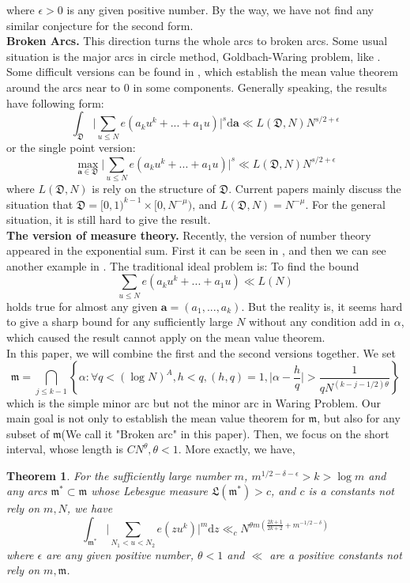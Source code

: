 \documentclass[10pt]{article}
\newtheorem{theorem}{Theorem}[section]
\begin{document}
where $\epsilon>0$ is any given positive number. By the way, we have not find any similar conjecture for the second form.\\
\textbf{Broken Arcs.} This direction turns the whole arcs to broken arcs. Some usual situation is the major arcs in circle method, Goldbach-Waring problem, like \cite{wei2014sumspowersequalprimes}. Some difficult versions can be found in \cite{oh2025extendedvinogradovsmeanvalue}, which establish the mean value theorem around the arcs near to $0$ in some components. Generally speaking, the results have following form:
\[
\int_{\mathfrak{D}}\bigg|\sum\limits_{u\leq N}e(a_ku^k+...+a_1u)\bigg|^{s}\mathrm{d}\textbf{a}\ll L(\mathfrak{D},N)N^{s/2+\epsilon}
\]
or the single point version:
\[
\max_{\textbf{a}\in\mathfrak{D}}\bigg|\sum\limits_{u\leq N}e(a_ku^k+...+a_1u)\bigg|^{s}\ll L(\mathfrak{D},N)N^{s/2+\epsilon}
\]
where $L(\mathfrak{D},N)$ is rely on the structure of $\mathfrak{D}$. Current papers mainly discuss the situation that $\mathfrak{D}=[0,1)^{k-1}\times[0,N^{-\mu})$, and $L(\mathfrak{D},N)=N^{-\mu}$. For the general situation, it is still hard to give the result.\\
\textbf{The version of measure theory.}
Recently, the version of number theory appeared in the exponential sum. First it can be seen in \cite{wooley2015perturbationsweylsums}, and then we can see another example in \cite{chen2020metrictheoryweylsums}. The traditional ideal problem is: To find the bound
\[
\sum\limits_{u\leq N}e(a_ku^k+...+a_1u)\ll L(N)
\]
holds true for almost any given $\textbf{a}=(a_1,...,a_k)$. But the reality is, it seems hard to give a sharp bound for any sufficiently large $N$ without any condition add in $\alpha$, which caused the result cannot apply on the mean value theorem.\\
In this paper, we will combine the first and the second versions together. We set
\[
\mathfrak{m}=\bigcap_{j\leq k-1}\left\{\alpha:\forall q<(\log N)^A,h<q,(h,q)=1,\Big|\alpha-\frac{h}{q}\Big|>\frac{1}{qN^{(k-j-1/2)\theta}}\right\}
\]
which is the simple minor arc but not the minor arc in Waring Problem. Our main goal is not only to establish the mean value theorem for $\mathfrak{m}$, but also for any subset of $\mathfrak{m}$(We call it "Broken arc" in this paper). Then, we focus on the short interval, whose length is $CN^{\theta},\theta<1$. More exactly, we have,
\begin{theorem}
For the sufficiently large number $m$, $m^{1/2-\delta-\epsilon}>k>\log m$ and any arcs $\mathfrak{m^*}\subset\mathfrak{m}$ whose Lebesgue measure $\mathfrak{L}(\mathfrak{m^*})>c$, and $c$ is a constants not rely on $m,N$, we have
\[
\int_{\mathfrak{m^*}}\bigg|\sum\limits_{{N_1}<u<{N_2}}{e(zu^k)}\bigg|^{m}\mathrm{d}z\ll_cN^{\theta m(\frac{2k+1}{2k+2}+m^{-1/2-\delta})}
\]
where $\epsilon$ are any given positive number, $\theta<1$ and $\ll$ are a positive constants not rely on $m,\mathfrak{m}$.
\end{theorem}
\end{document}
